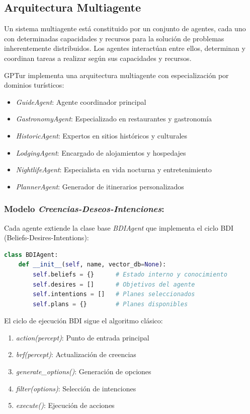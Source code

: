 \documentclass[10pt]{llncs}
\begin{document}
\vspace{\baselineskip}
\subsection{Arquitectura Multiagente}

Un sistema multiagente está constituido por un conjunto de agentes, cada uno con determinadas capacidades y recursos para la solución de problemas inherentemente distribuidos. Los agentes interactúan entre ellos, determinan y coordinan tareas a realizar según sus capacidades y recursos.

GPTur implementa una arquitectura multiagente con especialización por dominios turísticos:

\begin{itemize}
    \item \textit{GuideAgent}: Agente coordinador principal
    \item \textit{GastronomyAgent}: Especializado en restaurantes y gastronomía
    \item \textit{HistoricAgent}: Expertos en sitios históricos y culturales
    \item \textit{LodgingAgent}: Encargado de alojamientos y hospedajes
    \item \textit{NightlifeAgent}: Especialista en vida nocturna y entretenimiento
    \item \textit{PlannerAgent}: Generador de itinerarios personalizados
\end{itemize}

\subsubsection{Modelo \textit{Creencias-Deseos-Intenciones}:}
Cada agente extiende la clase base \textit{BDIAgent} que implementa el ciclo BDI (Beliefs-Desires-Intentions):

\begin{lstlisting}[language=Python,basicstyle=\small\ttfamily]
class BDIAgent:
    def __init__(self, name, vector_db=None):
        self.beliefs = {}      # Estado interno y conocimiento
        self.desires = []      # Objetivos del agente
        self.intentions = []   # Planes seleccionados
        self.plans = {}        # Planes disponibles
\end{lstlisting}

El ciclo de ejecución BDI sigue el algoritmo clásico:
\begin{enumerate}
    \item \textit{action(percept)}: Punto de entrada principal
    \item \textit{brf(percept)}: Actualización de creencias
    \item \textit{generate\_options()}: Generación de opciones
    \item \textit{filter(options)}: Selección de intenciones
    \item \textit{execute()}: Ejecución de acciones
\end{enumerate}
\end{document}
